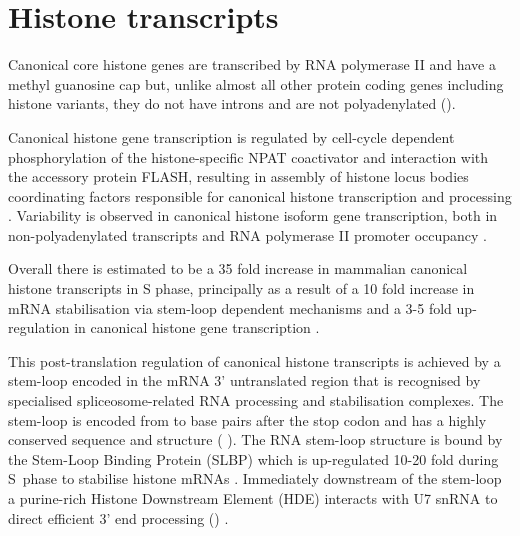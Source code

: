 \section{Histone transcripts}
  
	Canonical core histone genes are transcribed by RNA polymerase II 
	and have a methyl guanosine cap \citep{MarzluffNatRevGen2008}
	but, unlike almost all other protein coding genes including histone variants, 
	they do not have introns and are not polyadenylated ().

	Canonical histone gene transcription is regulated 
	by cell-cycle dependent phosphorylation of the histone-specific NPAT coactivator 
	and interaction with the accessory protein FLASH, 
	resulting in assembly of histone locus bodies 
	coordinating factors responsible for canonical histone transcription and processing 
	\citep{MarzluffNatRevGen2008,RattrayMueller2012,Hoefig2014}.
	Variability is observed in canonical histone isoform gene transcription, 
	both in non-polyadenylated transcripts \citep{YangGenomeBiol2011} 
	and RNA polymerase II promoter occupancy \citep{Ederveen2011}.

	Overall there is estimated to be a 35 fold increase in mammalian canonical histone transcripts in S phase,
	principally as a result of a 10 fold increase in mRNA stabilisation via stem-loop dependent mechanisms 
	and a 3-5 fold up-regulation in canonical histone gene transcription \citep{HarrisMCB1991}.

	This post-translation regulation of canonical histone transcripts 
	is achieved by a stem-loop encoded in the mRNA 3' untranslated region 
	that is recognised by specialised spliceosome-related RNA processing and stabilisation complexes.
	The stem-loop is encoded from \StemLoopStart{} to \StemLoopEnd{} base pairs after the stop codon 
	and has a highly conserved sequence and structure ( \citep{stem-loop-structure}).
	The RNA stem-loop structure is bound by the Stem-Loop Binding Protein (SLBP) 
	which is up-regulated 10-20 fold during S~phase to stabilise histone mRNAs \citep{SLBP-regulation}. 
	Immediately downstream of the stem-loop a purine-rich Histone Downstream Element (HDE) 
	interacts with U7 snRNA to direct efficient 3' end processing () \citep{HDE-sequence}.

  \begin{figure*}
    \centering
    \hfill
  \end{figure*}

